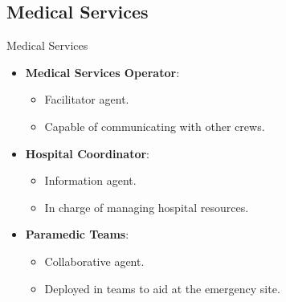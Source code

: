 \subsection{Medical Services}
\begin{frame}{Medical Services}
    \begin{itemize}
        \item \textbf{Medical Services Operator}:
        \begin{itemize}
            \item \alert{Facilitator} agent.
            \item Capable of \alert{communicating} with other crews.
        \end{itemize}
        \item \textbf{Hospital Coordinator}:
        \begin{itemize}
            \item \alert{Information} agent.
            \item In charge of \alert{managing} hospital \alert{resources}.
        \end{itemize}
        \item \textbf{Paramedic Teams}:
        \begin{itemize}
            \item \alert{Collaborative} agent.
            \item Deployed in \alert{teams} to aid at the emergency site.
        \end{itemize}
    \end{itemize}
\end{frame} 